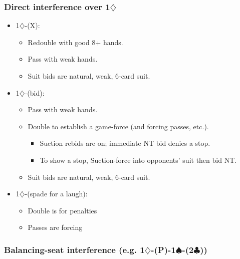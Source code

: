 \documentclass[a4paper,14pt]{extarticle}
\begin{document}
\subsubsection{Direct interference over 1$\diamondsuit$}
\label{sec:intf:1d}

\begin{itemize}
\item 1$\diamondsuit$-(X):
	\begin{itemize}
   \item Redouble with good 8+ hands.
   \item Pass with weak hands.
   \item Suit bids are natural, weak, 6-card suit.
	\end{itemize}
\newpage
\item 1$\diamondsuit$-(bid):
	\begin{itemize}
   \item Pass with weak hands.
   \item Double to establish a game-force (and forcing passes, etc.).
		\begin{itemize}
      \item Suction rebids are on; immediate NT bid denies a stop.
      \item To show a stop, Suction-force into opponents' suit then bid NT.
		\end{itemize}
   \item Suit bids are natural, weak, 6-card suit.
	\end{itemize}
\item 1$\diamondsuit$-(spade for a laugh):
	\begin{itemize}
   \item Double is for penalties
   \item Passes are forcing
	\end{itemize}
\end{itemize}

\subsubsection{Balancing-seat interference (e.g. 1$\diamondsuit$-(P)-1$\spadesuit$-(2$\clubsuit$))}
\label{sec:intf:bal}
\end{document}
